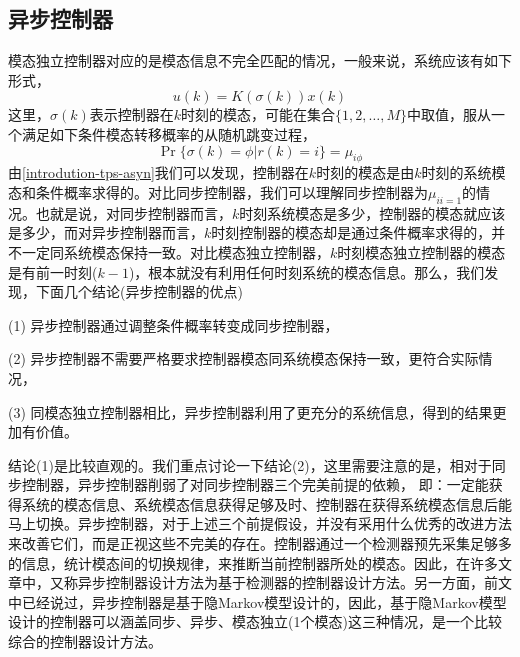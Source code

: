	\subsection{异步控制器}
	模态独立控制器对应的是模态信息不完全匹配的情况，一般来说，系统应该有如下形式，
	\begin{equation}
	u(k)=K(\sigma(k))x(k)
	\end{equation}
	这里，$\sigma(k)$表示控制器在$k$时刻的模态，可能在集合$\{1,2,\dots,M\}$中取值，服从一个满足如下条件模态转移概率的从随机跳变过程，
	\begin{equation}\label{introdution-tps-asyn}
	\Pr\{\sigma(k)=\phi|r(k)=i \}=\mu_{i\phi}
	\end{equation}
	由\eqref{introdution-tps-asyn}我们可以发现，控制器在$k$时刻的模态是由$k$时刻的系统模态和条件概率求得的。对比同步控制器，我们可以理解同步控制器为$\mu_{ii=1}$的情况。也就是说，对同步控制器而言，$k$时刻系统模态是多少，控制器的模态就应该是多少，而对异步控制器而言，$k$时刻控制器的模态却是通过条件概率求得的，并不一定同系统模态保持一致。对比模态独立控制器，$k$时刻模态独立控制器的模态是有前一时刻($k-1$)，根本就没有利用任何时刻系统的模态信息。那么，我们发现，下面几个结论(异步控制器的优点)
		
		(1) 异步控制器通过调整条件概率转变成同步控制器，
		
		(2) 异步控制器不需要严格要求控制器模态同系统模态保持一致，更符合实际情况，
		
		(3) 同模态独立控制器相比，异步控制器利用了更充分的系统信息，得到的结果更加有价值。
		
		结论(1)是比较直观的。我们重点讨论一下结论(2)，这里需要注意的是，相对于同步控制器，异步控制器削弱了对同步控制器三个完美前提的依赖， 即：一定能获得系统的模态信息、系统模态信息获得足够及时、控制器在获得系统模态信息后能马上切换。异步控制器，对于上述三个前提假设，并没有采用什么优秀的改进方法来改善它们，而是正视这些不完美的存在。控制器通过一个检测器预先采集足够多的信息，统计模态间的切换规律，来推断当前控制器所处的模态。因此，在许多文章中，又称异步控制器设计方法为基于检测器的控制器设计方法。另一方面，前文中已经说过，异步控制器是基于隐Markov模型设计的，因此，基于隐Markov模型设计的控制器可以涵盖同步、异步、模态独立(1个模态)这三种情况，是一个比较综合的控制器设计方法。
	
